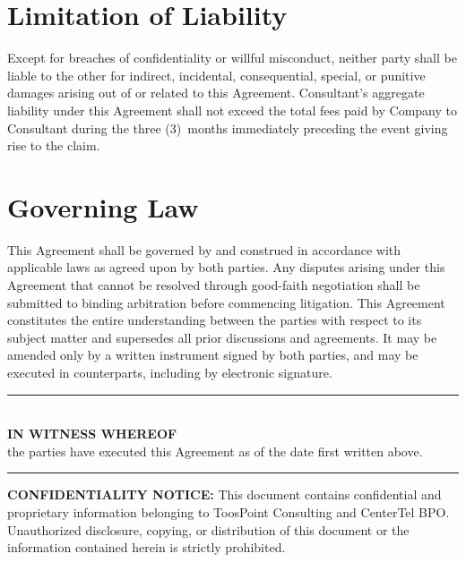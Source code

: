 \documentclass{toospoint}
\begin{document}
\section{Limitation of Liability}

Except for breaches of confidentiality or willful misconduct, neither party
shall be liable to the other for indirect, incidental, consequential, special,
or punitive damages arising out of or related to this Agreement. Consultant's
aggregate liability under this Agreement shall not exceed the total fees paid
by Company to Consultant during the three (3)~months immediately preceding the
event giving rise to the claim.

\section{Governing Law}

This Agreement shall be governed by and construed in accordance with applicable
laws as agreed upon by both parties. Any disputes arising under this Agreement
that cannot be resolved through good-faith negotiation shall be submitted to
binding arbitration before commencing litigation. This Agreement constitutes
the entire understanding between the parties with respect to its subject
matter and supersedes all prior discussions and agreements. It may be amended
only by a written instrument signed by both parties, and may be executed in
counterparts, including by electronic signature.

\vspace{28pt}

\begin{center}
  {\color{TPBorder}\rule{0.7\textwidth}{0.5pt}}\\[6pt]
  {\sffamily\bfseries\color{TPDark}IN WITNESS WHEREOF}\\[4pt]
  {\sffamily\small\color{TPGray}the parties have executed this Agreement as of the date first written above.}\\[6pt]
  {\color{TPBorder}\rule{0.7\textwidth}{0.5pt}}
\end{center}

\vspace{20pt}

\noindent
{}
\hfill
{}

\vspace{32pt}

\begin{mdframed}[
  linecolor=TPBorder,
  linewidth=1pt,
  roundcorner=4pt,
  backgroundcolor=TPLight,
  innerleftmargin=14pt,
  innerrightmargin=14pt,
  innertopmargin=10pt,
  innerbottommargin=10pt
]
\sffamily\footnotesize\color{TPGray}
\textbf{CONFIDENTIALITY NOTICE:} This document contains confidential and
proprietary information belonging to ToosPoint Consulting and CenterTel BPO.
Unauthorized disclosure, copying, or distribution of this document or the
information contained herein is strictly prohibited.
\end{mdframed}
\end{document}
